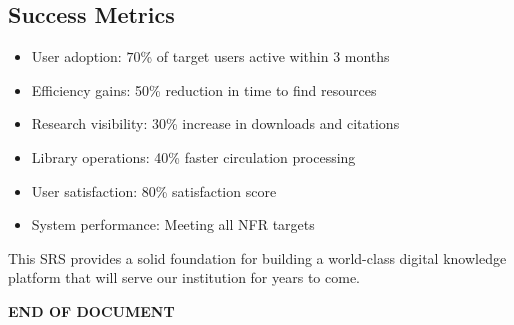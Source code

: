 \documentclass[12pt,a4paper]{report}
\begin{document}
\subsection{Success Metrics}
\begin{itemize}
    \item User adoption:  $70$\% of target users active within 3 months
    \item Efficiency gains: 50\% reduction in time to find resources
    \item Research visibility: 30\% increase in downloads and citations
    \item Library operations: 40\% faster circulation processing
    \item User satisfaction: $80$\% satisfaction score
    \item System performance: Meeting all NFR targets
\end{itemize}

This SRS provides a solid foundation for building a world-class digital knowledge platform that will serve our institution for years to come.

\vspace{2cm}

\noindent\textbf{END OF DOCUMENT}
\end{document}
